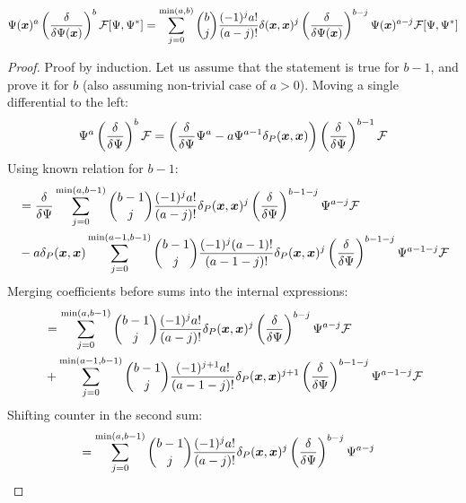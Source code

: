 \begin{lemma}
\label{lmm:formalism:transformations:swap-differential}
\[
	\Psi(\boldsymbol{x})^a \left( \frac{\delta}{\delta \Psi(\boldsymbol{x})} \right)^b \mathcal{F}[\Psi, \Psi^*]
	= \sum_{j=0}^{\min(a, b)}
		\binom{b}{j} \frac{(-1)^j a!}{(a - j)!}
		\delta(\boldsymbol{x}, \boldsymbol{x})^j
		\left( \frac{\delta}{\delta \Psi(\boldsymbol{x})} \right)^{b - j}
		\Psi(\boldsymbol{x})^{a - j}
		\mathcal{F}[\Psi, \Psi^*]
\]
\end{lemma}
\begin{proof}
Proof by induction.
Let us assume that the statement is true for $b - 1$, and prove it for $b$
(also assuming non-trivial case of $a > 0$).
Moving a single differential to the left:
\[
	\Psi^a \left( \frac{\delta}{\delta \Psi} \right)^b \mathcal{F}
	= \left(
			\frac{\delta}{\delta \Psi} \Psi^a
			- a \Psi^{a - 1} \delta_P(\boldsymbol{x}, \boldsymbol{x})
		\right)
		\left( \frac{\delta}{\delta \Psi} \right)^{b-1}
		\mathcal{F}
\]
Using known relation for $b-1$:
\begin{equation*}
\begin{split}
	& = \frac{\delta}{\delta \Psi} \sum_{j = 0}^{\min(a, b-1)}
			\binom{b-1}{j} \frac{(-1)^j a!}{(a-j)!} \delta_P(\boldsymbol{x}, \boldsymbol{x})^j
			\left( \frac{\delta}{\delta \Psi} \right)^{b-1-j} \Psi^{a-j}
			\mathcal{F} \\
	& - a \delta_P(\boldsymbol{x}, \boldsymbol{x}) \sum_{j = 0}^{\min(a-1, b-1)}
			\binom{b-1}{j} \frac{(-1)^j (a-1)!}{(a-1-j)!} \delta_P(\boldsymbol{x}, \boldsymbol{x})^j
			\left( \frac{\delta}{\delta \Psi} \right)^{b-1-j} \Psi^{a-1-j}
			\mathcal{F}
\end{split}
\end{equation*}
Merging coefficients before sums into the internal expressions:
\begin{equation*}
\begin{split}
	& = \sum_{j = 0}^{\min(a, b-1)}
			\binom{b-1}{j} \frac{(-1)^j a!}{(a-j)!} \delta_P(\boldsymbol{x}, \boldsymbol{x})^j
			\left( \frac{\delta}{\delta \Psi} \right)^{b-j} \Psi^{a-j}
			\mathcal{F} \\
	& + \sum_{j = 0}^{\min(a-1, b-1)}
			\binom{b-1}{j} \frac{(-1)^{j+1} a!}{(a-1-j)!} \delta_P(\boldsymbol{x}, \boldsymbol{x})^{j+1}
			\left( \frac{\delta}{\delta \Psi} \right)^{b-1-j} \Psi^{a-1-j}
			\mathcal{F}
\end{split}
\end{equation*}
Shifting counter in the second sum:
\begin{equation*}
\begin{split}
	& = \sum_{j = 0}^{\min(a, b-1)}
			\binom{b-1}{j} \frac{(-1)^j a!}{(a-j)!} \delta_P(\xvec, \xvec)^j
			\left( \frac{\delta}{\delta \Psi} \right)^{b-j} \Psi^{a-j}

\end{split}
\end{equation*}
\end{proof}
